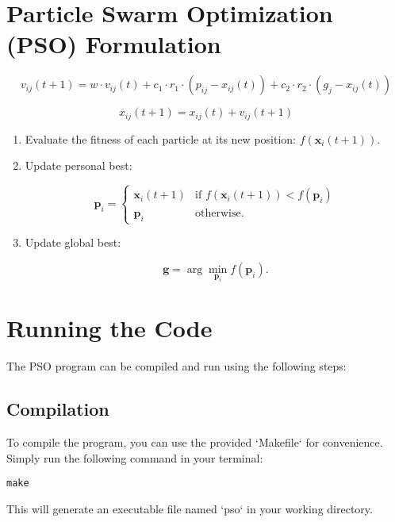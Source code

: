 \documentclass[12pt]{article}
\begin{document}
\newpage
		
	
	
	\section{Particle Swarm Optimization (PSO) Formulation}
	
	
	\[
	v_{ij}(t+1) = w \cdot v_{ij}(t) + c_1 \cdot r_1 \cdot (p_{ij} - x_{ij}(t)) + c_2 \cdot r_2 \cdot (g_j - x_{ij}(t))
	\]
	
	
	\[
	x_{ij}(t+1) = x_{ij}(t) + v_{ij}(t+1)
	\]
	
	
	\begin{enumerate}
		\item Evaluate the fitness of each particle at its new position: \(f(\mathbf{x}_i(t+1))\).
		
		\item  Update personal best:
		
		\[
		\mathbf{p}_i = 
		\begin{cases} 
			\mathbf{x}_i(t+1) & \text{if } f(\mathbf{x}_i(t+1)) < f(\mathbf{p}_i) \\
			\mathbf{p}_i & \text{otherwise.}
		\end{cases}
		\]
		
		\item  Update global best:
		
		\[
		\mathbf{g} = \arg\min_{\mathbf{p}_i} f(\mathbf{p}_i).
		\]
	\end{enumerate}
	
	
	
	
	
	\section{Running the Code}

The PSO program can be compiled and run using the following steps:

\subsection{Compilation}
To compile the program, you can use the provided `Makefile` for convenience. Simply run the following command in your terminal:

\begin{lstlisting}[basicstyle=\small]
make
\end{lstlisting}

This will generate an executable file named `pso` in your working directory.
\end{document}
